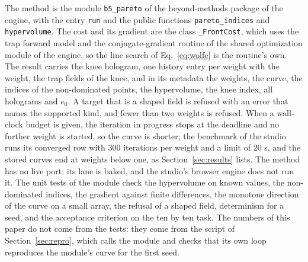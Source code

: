 The method is the module \texttt{b5\_pareto} of the beyond-methods package of the engine, with the entry \texttt{run} and the public functions \texttt{pareto\_indices} and \texttt{hypervolume}. The cost and its gradient are the class \texttt{\_FrontCost}, which uses the trap forward model and the conjugate-gradient routine of the shared optimization module of the engine, so the line search of Eq.~\ref{eq:wolfe} is the routine's own. The result carries the knee hologram, one history entry per weight with the weight, the trap fields of the knee, and in its metadata the weights, the curve, the indices of the non-dominated points, the hypervolume, the knee index, all holograms and $e_0$. A target that is a shaped field is refused with an error that names the supported kind, and fewer than two weights is refused.
When a wall-clock budget is given, the iteration in progress stops at the deadline and no further weight is started, so the curve is shorter; the benchmark of the studio runs its converged row with 300 iterations per weight and a limit of 20 s, and the stored curves end at weights below one, as Section~\ref{sec:results} lists. The method has no live port: its lane is baked, and the studio's browser engine does not run it. The unit tests of the module check the hypervolume on known values,
the non-dominated indices, the gradient against finite differences, the monotone direction of the curve on a small array, the refusal of a shaped field, determinism for a seed, and the acceptance criterion on the ten by ten task. The numbers of this paper do not come from the tests: they come from the script of Section~\ref{sec:repro}, which calls the module and checks that its own loop reproduces the module's curve for the first seed.
